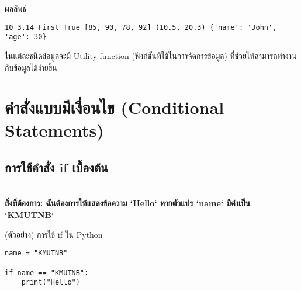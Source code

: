 \documentclass[12pt,a4paper]{article}
\newcommand{\textlight}[1]{{\thailightfont #1}}
\begin{document}
\begin{resultbox}{ผลลัพธ์}
\begin{verbatim}
10 3.14 First True [85, 90, 78, 92] (10.5, 20.3) {'name': 'John', 'age': 30}
\end{verbatim}
\end{resultbox}

\textlight{ในแต่ละชนิดข้อมูลจะมี Utility function (ฟังก์ชันที่ใช้ในการจัดการข้อมูล) ที่ช่วยให้สามารถทำงานกับข้อมูลได้ง่ายขึ้น}

\section{คำสั่งแบบมีเงื่อนไข (Conditional Statements)}

\hspace{1cm}\textlight{คำสั่งแบบมีเงื่อนไข (Conditional Statements) เป็นคำสั่งที่ใช้ในการตัดสินใจว่าควรทำอะไรต่อไปในโปรแกรมตามเงื่อนไขที่กำหนด คำสั่งเหล่านี้ช่วยให้โปรแกรมสามารถทำงานได้อย่างยืดหยุ่นและตอบสนองต่อสถานการณ์ต่างๆ (โค้ดด้านล่าง)}

\subsection{การใช้คำสั่ง if เบื้องต้น}

\hspace{1cm}\textlight{คำสั่ง if ใช้เพื่อตรวจสอบเงื่อนไข ถ้าเงื่อนไขเป็นจริง (True) จะทำการดำเนินการตามที่กำหนดไว้ในบล็อกของ if ดังกล่าว}\\
\textlight{\textbf{สิ่งที่ต้องการ: ฉันต้องการให้แสดงข้อความ `Hello` หากตัวแปร `name` มีค่าเป็น `KMUTNB`}}

\begin{codebox}{(ตัวอย่าง) การใช้ if ใน Python}
\begin{lstlisting}[style=python]
name = "KMUTNB"

if name == "KMUTNB":
    print("Hello")
\end{lstlisting}
\end{codebox}

\vspace{0.5cm}
\end{document}
